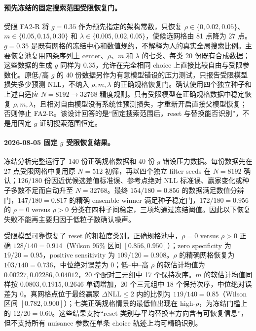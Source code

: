 \paragraph{预先冻结的固定搜索范围受限恢复门。}
受限 FA2-R 将 $g=0.35$ 作为预先指定的架构常数，只恢复 $\rho\in\{0,0.02,0.05\}$、$m\in\{0.05,0.15,0.30\}$ 和 $\lambda\in\{0.005,0.02,0.05\}$，使候选网格由 81 点降为 27 点。$g=0.35$ 是既有网格的冻结中心和数值规约，不解释为人的真实全局搜索比例。主要恢复池复用四条序列上 center、$\rho$、$m$ 和 $\lambda$ 的七类、每类 20 份既有合成数据；这些数据的生成 $g$ 同样为 0.35，允许在完全相同 choice 上直接比较自由与受限参数化。原低/高 $g$ 的 40 份数据另作为有意模型错设的压力测试，只报告受限模型损失多少预测 NLL，不纳入 $\rho,m,\lambda$ 的正确规格恢复门。确认使用四个独立种子和上述自适应 $N=8192\rightarrow32768$ 精度规则。只有受限模型在正确规格数据中稳定恢复 $\rho,m,\lambda$，且相对自由模型没有系统性预测损失，才重新开启直接父模型恢复；否则停止 FA2-R。该设计回答的是“固定搜索范围后，reset 与替换能否识别”，不是用固定 $g$ 证明搜索范围恒定。

\paragraph{2026-08-05 固定 $g$ 受限恢复结果。}
冻结分析完整运行了 140 份正确规格数据和 40 份 $g$ 错设压力数据。每份数据先在 27 点受限网格中复用原 $N=512$ 初筛，再以四个独立 filter seeds 在 $N=8192$ 确认；126/180 份因近优候选差值标准误、参考点绝对 NLL 标准误、赢家变化或种子多数不足而自动升至 $N=32768$。最终 $154/180=0.856$ 的数据满足数值分辨门，$147/180=0.817$ 的精确 ensemble winner 满足种子稳定门，$172/180=0.956$ 的 $\rho=0$ versus $\rho>0$ 分类在四种子间稳定，三项均通过冻结阈值。因此以下恢复失败不能再主要归因于低粒子数确认噪声。

受限模型可靠恢复了 reset 的粗粒度类别。正确规格池中，$\rho=0$ versus $\rho>0$ 正确 $128/140=0.914$（Wilson $95\%$ 区间 $[0.856,0.950]$）；zero specificity 为 $19/20=0.95$，positive sensitivity 为 $109/120=0.908$。$\rho$ 的精确网格恢复为 $103/140=0.736$，中位绝对误差为 0；低--中--高 $\rho$ 的软估计均值为 $0.00227,0.02286,0.04012$，20 个配对三元组中 17 个保持次序。$m$ 的软估计均值同样按 $0.0803,0.1915,0.2646$ 单调增加，20 个三元组中 18 个保持次序，中位绝对误差为 0。真网格点位于最终赢家 $\Delta\mathrm{NLL}\leq2$ 内的比例为 $119/140=0.85$（Wilson 区间 $[0.782,0.900]$）；七类正确规格情景的最低值出现在 high-$\rho$，为冻结门槛上的 $12/20=0.60$。这些结果支持“reset 类别与平均替换率方向含有可恢复信息”，但不支持所有 nuisance 参数在单条 choice 轨迹上均可精确识别。

